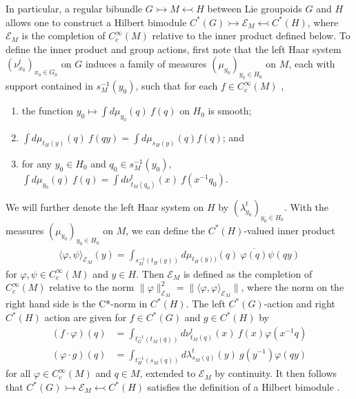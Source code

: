 \documentclass[sn-mathphys,Numbered]{sn-jnl}
\providecommand{\norm}[1]{\lVert#1\rVert}
\providecommand{\inner}[2]{\langle#1,#2\rangle}
\begin{document}
In particular, a regular bibundle $G\rightarrowtail M\leftarrowtail H$ between Lie groupoids $G$ and $H$ allows one to construct a Hilbert bimodule $C^*(G)\rightarrowtail\mathcal{E}_M\leftarrowtail C^*(H)$, where $\mathcal{E}_M$ is the completion of $C_c^\infty(M)$ relative to the inner product defined below.  To define the inner product and group actions, first note that the left Haar system $(\nu^t_{x_0})_{x_0\in G_0}$ on $G$ induces a family of measures $(\mu_{y_0})_{y_0\in H_0}$ on $M$, each with support contained in $s_M^{-1}(y_0)$, such that for each $f\in C_c^\infty(M)$ \citep{La01a},
\begin{enumerate}
    \item the function $y_0\mapsto \int d\mu_{y_0}(q)\ f(q)$ on $H_0$ is smooth;
    \item $\int d\mu_{t_H(y)}(q)\ f(qy) = \int d\mu_{s_H(y)}(q)f(q)$; and
    \item for any $y_0\in H_0$ and $q_0\in s_M^{-1}(y_0)$, $\int d\mu_{y_0}(q)\ f(q) = \int d\nu^t_{t_M(q_0)}(x)\ f(x^{-1}q_0)$.
\end{enumerate}
We will further denote the left Haar system on $H$ by $(\lambda^t_{y_0})_{y_0\in H_0}$.
With the measures $(\mu_{y_0})_{y_0\in H_0}$ on $M$, we can define the $C^*(H)$-valued inner product
\begin{align}
\label{eq:inner_product}
    \inner{\varphi}{\psi}_{\mathcal{E}_M}(y) = \int_{s_M^{-1}(t_H(y))}d\mu_{t_H(y))}(q)\  \overline{\varphi(q)}\psi(qy)
\end{align}
for $\varphi,\psi\in C_c^\infty(M)$ and $y\in H$.  Then $\mathcal{E}_M$ is defined as the completion of $C_c^\infty(M)$ relative to the norm $\norm{\varphi}_{\mathcal{E}_M}^2 = \norm{\inner{\varphi}{\varphi}_{\mathcal{E}_M}}$, where the norm on the right hand side is the C*-norm in $C^*(H)$.  The left $C^*(G)$-action and right $C^*(H)$ action are given for $f\in C^*(G)$ and $g\in C^*(H)$ by
\begin{align}
\label{eq:left_bimodule_action}
    (f\cdot \varphi)(q) &= \int_{t_G^{-1}(t_M(q))}d\nu^t_{t_M(q)}(x)\ f(x)\varphi(x^{-1}q)\\
\label{eq:right_bimodule_action}(\varphi\cdot g)(q) &= \int_{t_H^{-1}(s_M(q))} d\lambda^t_{s_M(q)}(y)\ g(y^{-1})\varphi(qy)
\end{align}
for all $\varphi\in C_c^\infty(M)$ and $q\in M$, extended to $\mathcal{E}_M$ by continuity. It then follows that $C^*(G)\rightarrowtail \mathcal{E}_M\leftarrowtail C^*(H)$ satisfies the definition of a Hilbert bimodule \citep{Gr78,MuReWi87,La01a}.
\end{document}
